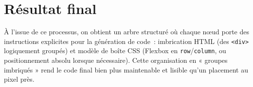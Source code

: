 \documentclass[11pt,a4paper]{article}
\newcommand{\code}[1]{\texttt{#1}}
\begin{document}
\section*{Résultat final}

À l'issue de ce processus, on obtient un arbre structuré où chaque nœud porte des instructions explicites pour la génération de code~: imbrication HTML (des \code{<div>} logiquement groupés) et modèle de boîte CSS (Flexbox en \code{row}/\code{column}, ou positionnement absolu lorsque nécessaire). Cette organisation en « groupes imbriqués » rend le code final bien plus maintenable et lisible qu'un placement au pixel près.
\end{document}
